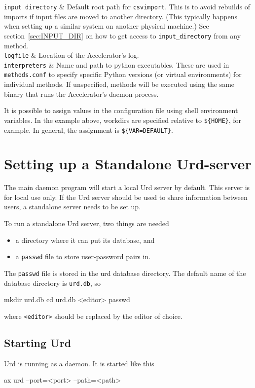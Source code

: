 \RPtwo \texttt{input directory} & Default root path for
\texttt{csvimport}.  This is to avoid rebuilds of imports if input
files are moved to another directory.  (This typically happens when
setting up a similar system on another physical machine.)  See
section~\ref{sec:INPUT_DIR} on how to get access to
\texttt{input\_directory} from any method.\\[1ex]

\RPtwo \texttt{logfile} & Location of the Accelerator's log.\\[1ex]

\RPtwo \texttt{interpreters} & Name and path to python executables.
These are used in \texttt{methods.conf} to specify specific Python
versions (or virtual environments) for individual methods.  If
unspecified, methods will be executed using the same binary that runs
the Accelerator's daemon process.\\[1ex]

\stoptabletwo

It is possible to assign values in the configuration file using shell
environment variables.  In the example above, workdirs are specified
relative to \texttt{\$\{HOME\}}, for example.  In general, the
assignment is \texttt{\$\{VAR=DEFAULT\}}.



\section{Setting up a Standalone Urd-server}
\label{sec:urd_setup}
The main daemon program will start a local Urd server by default.
This server is for local use only.  If the Urd server should be used
to share information between users, a standalone server needs to be
set up.

To run a standalone Urd server, two things are needed
\begin{itemize}
\item[] a directory where it can put its database, and
\item[] a \texttt{passwd} file to store user-password pairs in.
\end{itemize}
The \texttt{passwd} file is stored in the urd database directory.  The
default name of the database directory is \texttt{urd.db}, so
\begin{shell}
mkdir urd.db
cd urd.db
<editor> passwd
\end{shell}
where \texttt{<editor>} should be replaced by the editor of choice.


\subsection{Starting Urd}
Urd is running as a daemon.  It is started like this
\begin{shell}
ax urd --port=<port> --path=<path>
\end{shell}



